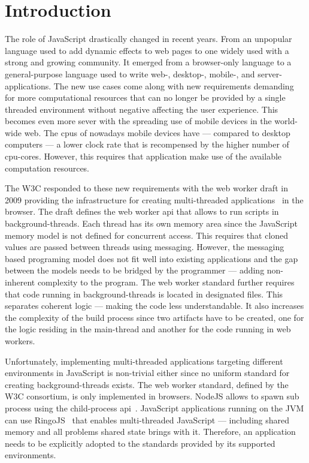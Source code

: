 \section{Introduction}\label{sec:introduction}
The role of JavaScript drastically changed in recent years. From an unpopular language used to add dynamic effects to web pages to one widely used with a strong and growing community. It emerged from a browser-only language to a general-purpose language used to write web-, desktop-, mobile-, and server-applications. The new use cases come along with new requirements demanding for more computational resources that can no longer be provided by a single threaded environment without negative affecting the user experience. This becomes even more sever with the spreading use of mobile devices in the world-wide web. The cpus of nowadays mobile devices have  --- compared to desktop computers --- a lower clock rate that is recompensed by the higher number of cpu-cores. However, this requires that application make use of the available computation resources. 

The W3C responded to these new requirements with the web worker draft in 2009 providing the infrastructure for creating multi-threaded applications~\cite{w3cWebWorker} in the browser. The draft defines the web worker api that allows to run scripts in background-threads. Each thread has its own memory area since the JavaScript memory model is not defined for concurrent access. This requires that cloned values are passed between threads using messaging. However, the messaging based programing model does not fit well into existing applications and the gap between the models needs to be bridged by the programmer --- adding non-inherent complexity to the program. The web worker standard further requires that code running in background-threads is located in designated files. This separates coherent logic --- making the code less understandable. It also increases the complexity of the build process since two artifacts have to be created, one for the logic residing in the main-thread and another for the code running in web workers. 

Unfortunately, implementing multi-threaded applications targeting different environments in JavaScript is non-trivial either since no uniform standard for creating background-threads exists. The web worker standard, defined by the W3C consortium, is only implemented in browsers. NodeJS allows to spawn sub process using the child-process api~\cite{childProcess}. JavaScript applications running on the JVM can use RingoJS~\cite{RingoJS} that enables multi-threaded JavaScript --- including shared memory and all problems shared state brings with it. Therefore, an application needs to be explicitly adopted to the standards provided by its supported environments.

